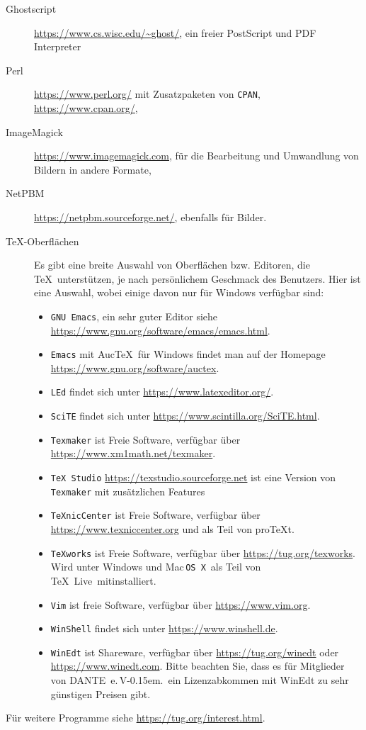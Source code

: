 \documentclass[12pt,ngerman,a4paper,fullparskip]{report}
\newcommand{\TL}{\TeX\ Live\xspace}
\newcommand{\acro}[1]{\texttt{#1}}
\newcommand{\cmdname}[1]{\texttt{#1}}
\providecommand*{\MacOSX}{Mac\,\acro{OS\,X}\xspace}
\newcommand{\dante}{DANTE~e.\,V\kern-0.15em.}
\begin{document}
\begin{description}
\item[Ghostscript] \url{https://www.cs.wisc.edu/~ghost/}, ein freier PostScript und PDF Interpreter
\item[Perl] \url{https://www.perl.org/} mit Zusatzpaketen von
      \acro{CPAN}, \url{https://www.cpan.org/},
\item[ImageMagick] \url{https://www.imagemagick.com}, für die Bearbeitung
      und Umwandlung von Bildern in andere Formate,
\item[NetPBM] \url{https://netpbm.sourceforge.net/}, ebenfalls für Bilder.

\item[\TeX-Oberflächen] Es gibt eine breite Auswahl von Oberflächen bzw.
     Editoren, die \TeX\ unterstützen, je nach persönlichem Geschmack des
     Benutzers. Hier ist eine Auswahl, wobei einige davon nur für Windows verfügbar sind:
  \begin{itemize}
  \item \cmdname{GNU Emacs}, ein sehr guter Editor siehe
        \url{https://www.gnu.org/software/emacs/emacs.html}.
  \item \cmdname{Emacs} mit Auc\TeX\ für Windows findet man auf der Homepage  \url{https://www.gnu.org/software/auctex}.
  \item \cmdname{LEd} findet sich unter \url{https://www.latexeditor.org/}.
  \item \cmdname{SciTE} findet sich unter
        \url{https://www.scintilla.org/SciTE.html}.
  \item \cmdname{Texmaker} ist Freie Software, verfügbar über
        \url{https://www.xm1math.net/texmaker}.
  \item \cmdname{TeX Studio} \url{https://texstudio.sourceforge.net}
        ist eine Version von \cmdname{Texmaker} mit zusätzlichen Features
  \item \cmdname{TeXnicCenter} ist Freie Software, verfügbar über
        \url{https://www.texniccenter.org} und als Teil von pro\TeX{}t.
  \item \cmdname{TeXworks} ist Freie Software, verfügbar über
        \url{https://tug.org/texworks}. Wird unter Windows und
        \MacOSX\ als Teil von \TL\  mitinstalliert.
  \item \cmdname{Vim} ist freie Software, verfügbar über
        \url{https://www.vim.org}.
  \item \cmdname{WinShell} findet sich unter \url{https://www.winshell.de}.
  \item \cmdname{WinEdt} ist Shareware, verfügbar über
        \url{https://tug.org/winedt} oder \url{https://www.winedt.com}.
        Bitte beachten Sie, dass es für Mitglieder von \dante\ ein
        Lizenzabkommen mit WinEdt zu sehr günstigen Preisen gibt. 
  \end{itemize}
\end{description}
Für weitere Programme siehe \url{https://tug.org/interest.html}.
\end{document}

